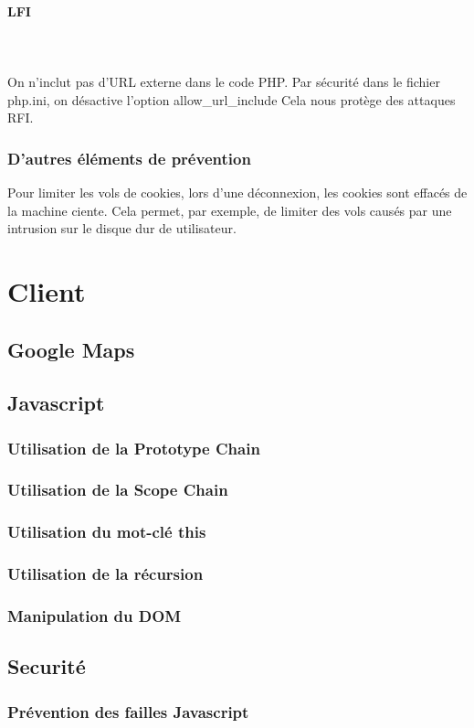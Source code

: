 \documentclass[a4paper]{article}
\begin{document}
\paragraph{LFI}
~~\\
\\
On n'inclut pas d'URL externe dans le code PHP.
Par sécurité dans le fichier php.ini, on désactive l'option allow\_url\_include 
Cela nous protège des attaques RFI.
		
\subsubsection{D'autres éléments de prévention}
		
Pour limiter les vols de cookies, lors d'une déconnexion, les cookies sont
effacés de la machine ciente. Cela permet, par exemple, de limiter des vols
causés par une intrusion sur le disque dur de utilisateur.
 		
\section{Client}

	\subsection{Google Maps}
	\subsection{Javascript} 
		\subsubsection{Utilisation de la Prototype Chain}
		\subsubsection{Utilisation de la Scope Chain}
		\subsubsection{Utilisation du mot-clé this}
		\subsubsection{Utilisation de la récursion}
		\subsubsection{Manipulation du DOM}
   \subsection{Securité} 
  		\subsubsection{Prévention des failles Javascript}
\end{document}
